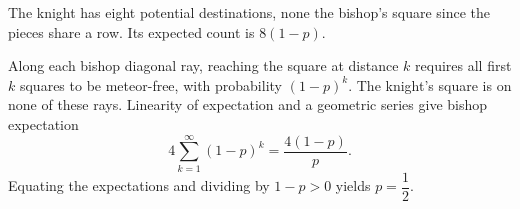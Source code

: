 The knight has eight potential destinations, none the bishop's square since the pieces share a row. Its expected count is $8(1-p)$.

Along each bishop diagonal ray, reaching the square at distance $k$ requires all first $k$ squares to be meteor-free, with probability $(1-p)^k$. The knight's square is on none of these rays. Linearity of expectation and a geometric series give bishop expectation
\[
4\sum_{k=1}^\infty(1-p)^k=\dfrac{4(1-p)}{p}.
\]
Equating the expectations and dividing by $1-p>0$ yields $\boxed{p=\dfrac{1}{2}}$.
